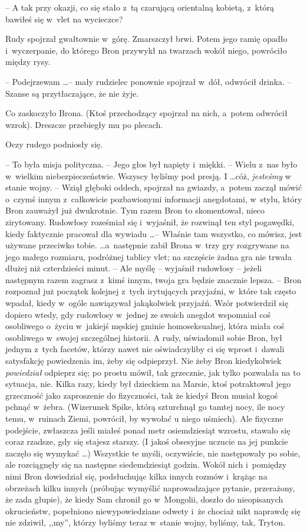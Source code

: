 \documentclass[oneside,polish,11pt,rmheadings]{mwbk}
\begin{document}
-- A tak przy okazji, co się stało z~tą czarującą orientalną kobietą, z~którą bawiłeś się w~vlet na wycieczce? 

Rudy spojrzał gwałtownie w~górę. Zmarszczył brwi. Potem jego ramię opadło i~wyczerpanie, do którego Bron przywykł na twarzach wokół niego, powróciło między rysy. 

-- Podejrzewam \ldots  -- mały rudzielec ponownie spojrzał w~dół, odwrócił drinka. -- Szanse są przytłaczające, że nie żyje. 

Co zaskoczyło Brona. (Ktoś przechodzący spojrzał na nich, a~potem odwrócił wzrok). Dreszcze przebiegły mu po plecach. 

Oczy rudego podniosły się.

-- To była misja polityczna. -- Jego głos był napięty i~miękki. -- Wielu z~nas było w~wielkim niebezpieczeństwie. Wszyscy byliśmy pod presją. I \ldots  cóż, \textit{jesteśmy  }w stanie wojny. -- Wziął głęboki oddech, spojrzał na gwiazdy, a~potem zaczął mówić o~czymś innym z~całkowicie pozbawionymi informacji anegdotami, w~stylu, który Bron zauważył już dwukrotnie. Tym razem Bron to skomentował, nieco zirytowany. Rudowłosy roześmiał się i~wyjaśnił, że rozwinął ten styl pogawędki, kiedy faktycznie pracował dla wywiadu  \ldots  -- Właśnie tam wszystko, co mówisz, jest używane przeciwko tobie.  \ldots   a~następnie zabił Brona w~trzy gry rozgrywane na jego małego rozmiaru, podróżnej tablicy vlet; na szczęście żadna gra nie trwała dłużej niż czterdzieści minut. -- Ale myślę -- wyjaśnił rudowłosy  -- jeżeli następnym razem zagrasz z~kimś innym, twoja gra będzie znacznie lepsza. -- Bron rozpoznał już początek kolejnej z~tych irytujących przyjaźni, w~które tak często wpadał, kiedy w~ogóle nawiązywał jakąkolwiek przyjaźń. Wzór potwierdził się dopiero wtedy, gdy rudowłosy w~jednej ze swoich anegdot wspomniał coś osobliwego o~życiu w~jakiejś męskiej gminie homoseksualnej, która miała coś osobliwego w~swojej szczególnej historii. A rudy, uświadomił sobie Bron, był jednym z~tych facetów, którzy nawet nie oświadczyliby ci się wprost i~dawali satysfakcję powiedzenia im, żeby się odpieprzył. Nie żeby Bron kiedykolwiek \textit{powiedział  }odpieprz się; po prostu mówił, tak grzecznie, jak tylko pozwalała na to sytuacja, nie. Kilka razy, kiedy był dzieckiem na Marsie, ktoś potraktował jego grzeczność jako zaproszenie do fizyczności, tak że kiedyś Bron musiał kogoś pchnąć w~żebra. (Wizerunek Spike, którą szturchnął go tamtej nocy, ile nocy temu, w~ruinach Ziemi, powrócił, by wywołać u niego uśmiech). Ale fizyczne podejście, zwłaszcza jeśli miałeś ponad metr osiemdziesiąt wzrostu, stawało się coraz rzadsze, gdy się stajesz starszy. (I jakoś obsesyjne uczucie na jej punkcie zaczęło się wymykać \ldots ) Wszystkie te myśli, oczywiście, nie następowały po sobie, ale rozciągnęły się na następne siedemdziesiąt godzin. Wokół nich i~pomiędzy nimi Bron dowiedział się, podsłuchując kilka innych rozmów i~krążąc na obrzeżach kilku innych (próbując wymyślić naprowadzające pytanie, przerażony, że zada głupie), że kiedy Sam chronił go w~Mongolii, doszło do nieopisanych okrucieństw, popełniono niewypowiedziane odwety i~że chociaż nikt naprawdę się nie zdziwił, ,,my'', którzy byliśmy teraz w~stanie wojny, byliśmy, tak, Tryton. 
\end{document}
